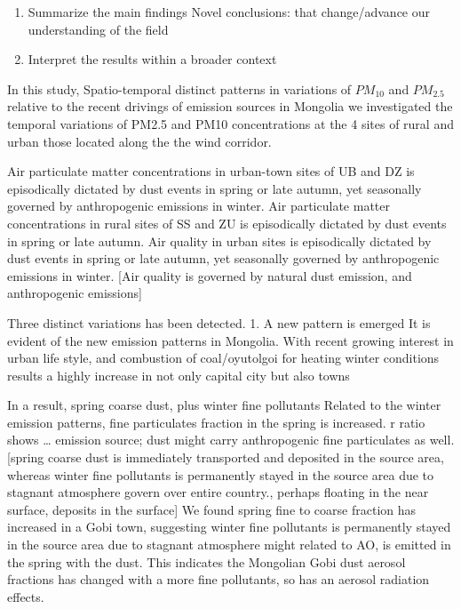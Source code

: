 \documentclass[
  11pt,
]{article}
\providecommand{\tightlist}{%
  \setlength{\itemsep}{0pt}\setlength{\parskip}{0pt}}
\begin{document}
\begin{enumerate}
\def\labelenumi{\arabic{enumi}.}
\setcounter{enumi}{1}
\tightlist
\item
  Summarize the main findings Novel conclusions: that change/advance our
  understanding of the field
\item
  Interpret the results within a broader context
\end{enumerate}

In this study, Spatio-temporal distinct patterns in variations of
\(PM_{10}\) and \(PM_{2.5}\) relative to the recent drivings of emission
sources in Mongolia we investigated the temporal variations of PM2.5 and
PM10 concentrations at the 4 sites of rural and urban those located
along the the wind corridor.

Air particulate matter concentrations in urban-town sites of UB and DZ
is episodically dictated by dust events in spring or late autumn, yet
seasonally governed by anthropogenic emissions in winter. Air
particulate matter concentrations in rural sites of SS and ZU is
episodically dictated by dust events in spring or late autumn. Air
quality in urban sites is episodically dictated by dust events in spring
or late autumn, yet seasonally governed by anthropogenic emissions in
winter. {[}Air quality is governed by natural dust emission, and
anthropogenic emissions{]}

Three distinct variations has been detected. 1. A new pattern is emerged
It is evident of the new emission patterns in Mongolia. With recent
growing interest in urban life style, and combustion of coal/oyutolgoi
for heating winter conditions results a highly increase in not only
capital city but also towns

In a result, spring coarse dust, plus winter fine pollutants Related to
the winter emission patterns, fine particulates fraction in the spring
is increased. r ratio shows \ldots{} emission source; dust might carry
anthropogenic fine particulates as well. {[}spring coarse dust is
immediately transported and deposited in the source area, whereas winter
fine pollutants is permanently stayed in the source area due to stagnant
atmosphere govern over entire country., perhaps floating in the near
surface, deposits in the surface{]} We found spring fine to coarse
fraction has increased in a Gobi town, suggesting winter fine pollutants
is permanently stayed in the source area due to stagnant atmosphere
might related to AO, is emitted in the spring with the dust. This
indicates the Mongolian Gobi dust aerosol fractions has changed with a
more fine pollutants, so has an aerosol radiation effects.
\end{document}
